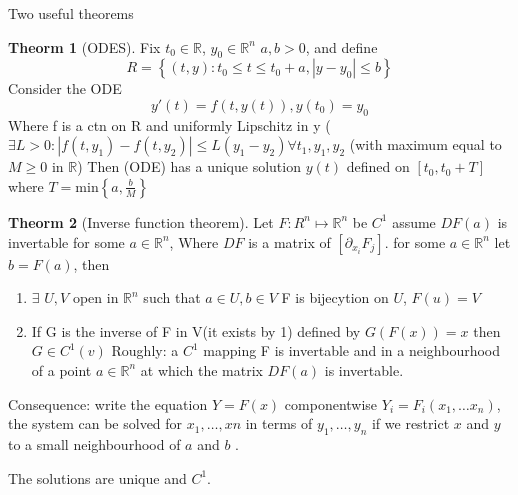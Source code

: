 \documentclass[a4paper]{article}
\theoremstyle{definition}
\newtheorem{theorem}{Theorm}[section]
\begin{document}
Two useful theorems 
\begin{theorem}[ODES]
	Fix $t_0\in \mathbb{R}$, $y_0\in \mathbb{R}^{n}$ $ a,b >0$, and define 
	\begin{equation}
		R=\left\{ \left( t,y \right) :t_0\le t\le t_0+a,\left|y-y_0 \right|\le b  \right\} 
	\end{equation} 
	Consider the ODE
	\begin{equation}
		y'\left( t \right) =f\left( t,y\left( t \right)  \right) ,y\left( t_0\right)=y_0
	\end{equation} 
	Where f is a ctn on R and uniformly Lipschitz in y ($\exists L>0:\left|f\left( t,y_1 \right) -f\left( t,y_2 \right) \right|\le L\left( y_1-y_2 \right)  \forall t_1,y_1,y_2 $ (with maximum equal to $M\ge 0$ in $\mathbb{R}$)
	Then (ODE) has a unique solution $y\left( t \right) $ defined on $\left[ t_0,t_0+T \right] $ where $T=\text{min}\left\{ a,\frac{b}{M} \right\} $
\end{theorem}
\begin{theorem}[Inverse function theorem]
	Let $F:R^{n}\mapsto \mathbb{R}^{n }$ be $C^{1} $ assume $DF\left( a \right)  $ is invertable for some $a\in \mathbb{R}^{n}$, Where $DF$ is a matrix of $[\partial_{x_i}F_j]$. for some $a\in \mathbb{R}^{n}$ let $b=F\left( a \right) $, then 
	\begin{enumerate}
		\item $\exists $ $U,V$ open in $\mathbb{R}^{n}$ such that $a\in U,b\in V$ F is bijecytion on $U$, $F\left( u \right) =V$
		\item If G is the inverse of F in V(it exists by 1) defined by $G\left( F\left( x \right)  \right) =x$ then $G\in C^{1}\left( v \right) $
			Roughly: a $C^{1} $ mapping F is invertable and in a neighbourhood of a point $a\in \mathbb{R}^{n}$ at which the matrix $DF\left( a \right)  $ is invertable. 

	\end{enumerate}
			Consequence: write the equation $Y=F\left( x \right) $ componentwise $Y_i=F_i\left( x_1,\ldots x_n \right) $, the system can be solved for $x_1,\ldots,xn$ in terms of $y_1,\ldots,y_n$ if we restrict $x$ and $y$ to a small neighbourhood of $a$ and $b$ . 

			The solutions are unique and $C^{1}$. 
\end{theorem}
\end{document}
